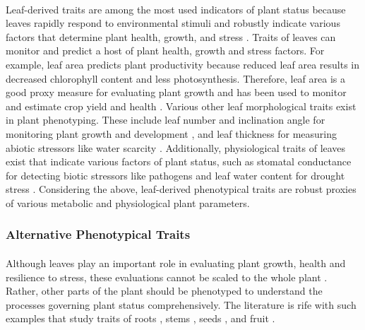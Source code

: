 \paragraph{}
Leaf-derived traits are among the most used indicators of plant status because leaves rapidly respond to environmental stimuli and robustly indicate various factors that determine plant health, growth, and stress \cite{zhangHighthroughputPhenotypingPlant2023}. Traits of leaves can monitor and predict a host of plant health, growth and stress factors. For example, leaf area predicts plant productivity because reduced leaf area results in decreased chlorophyll content and less photosynthesis. Therefore, leaf area is a good proxy measure for evaluating plant growth and has been used to monitor and estimate crop yield and health \cite{zhangLeafAreaIndex2021}. Various other leaf morphological traits exist in plant phenotyping. These include leaf number and inclination angle for monitoring plant growth and development \cite{praveenkumarRosettePlantSegmentation2020, zhangHighthroughputPhenotypingPlant2023}, and leaf thickness for measuring abiotic stressors like water scarcity \cite{afzalLeafThicknessPredict2017}. Additionally, physiological traits of leaves exist that indicate various factors of plant status, such as stomatal conductance for detecting biotic stressors like pathogens \cite{ishimweApplicationsThermalImaging2014} and leaf water content for drought stress \cite{watanabeFundamentalStudyWater2022}. Considering the above, leaf-derived phenotypical traits are robust proxies of various metabolic and physiological plant parameters.

\subsubsection{Alternative Phenotypical Traits}
\paragraph{}
Although leaves play an important role in evaluating plant growth, health and resilience to stress, these evaluations cannot be scaled to the whole plant \cite{zhangHighthroughputPhenotypingPlant2023}. Rather, other parts of the plant should be phenotyped to understand the processes governing plant status comprehensively. The literature is rife with such examples that study traits of roots \cite{bodnerHyperspectralImagingNovel2018}, stems \cite{daschoudhuryAutomatedStemAngle2017}, seeds \cite{zhangHighThroughputPhenotypingSeed2018}, and fruit \cite{abebeImageBasedHighThroughputPhenotyping2023}.